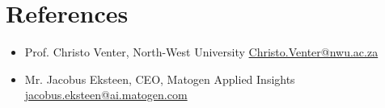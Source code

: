 \documentclass[a4paper,10pt]{article}
\begin{document}
\section*{References}
\begin{itemize}
	\item Prof. Christo Venter, North-West University \href{mailto:Christo.Venter@nwu.ac.za}{Christo.Venter@nwu.ac.za}
	\item Mr. Jacobus Eksteen, CEO, Matogen Applied Insights \href{mailto:jacobus.eksteen@ai.matogen.com}{jacobus.eksteen@ai.matogen.com}
\end{itemize}
	
\end{document}
